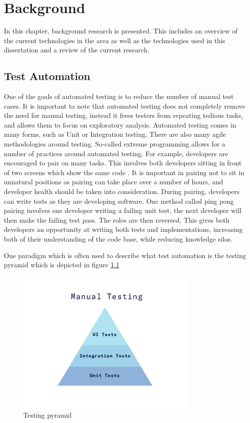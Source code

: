 \chapter{Background}

In this chapter, background research is presented. This includes an overview of the current technologies in the area as well as the technologies used in this dissertation and a review of the current research.

\section{Test Automation}

One of the goals of automated testing is to reduce the number of manual test cases. It is important to note that automated testing does not completely remove the need for manual testing, instead it frees testers from repeating tedious tasks, and allows them to focus on exploratory analysis. Automated testing comes in many forms, such as Unit or Integration testing. There are also many agile methodologies around testing. So-called extreme programming allows for a number of practices around automated testing. For example, developers are encouraged to pair on many tasks. This involves both developers sitting in front of two screens which show the same code \cite{6901641}. It is important in pairing not to sit in unnatural positions as pairing can take place over a number of hours, and developer health should be taken into consideration. During pairing, developers can write tests as they are developing software. One method called ping pong pairing involves one developer writing a failing unit test, the next developer will then make the failing test pass. The roles are then reversed. This gives both developers an opportunity at writing both tests and implementations, increasing both of their understanding of the code base, while reducing knowledge silos. 

One paradigm which is often used to describe what test automation is the testing pyramid which is depicted in figure \ref{fig:testing-pyramid}

\begin{figure}[!h]
  \centering
    \includegraphics[width=0.8\textwidth]{figures/testing-pyramid.png}
    \caption{Testing pyramid}
    \label{fig:testing-pyramid}
\end{figure}

